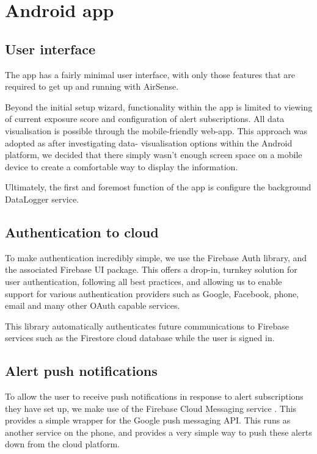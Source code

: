 \documentclass[sigconf, nonacm]{acmart}
\begin{document}
\section{Android app}

\subsection{User interface}

The app has a fairly minimal user interface, with only those features that are required to
get up and running with AirSense. 

Beyond the initial setup wizard, functionality within the app is limited to viewing of current
exposure score and configuration of alert subscriptions. All data visualisation is possible
through the mobile-friendly web-app. This approach was adopted as after investigating data-
visualisation options within the Android platform, we decided that there simply wasn't enough
screen space on a mobile device to create a comfortable way to display the information.

Ultimately, the first and foremost function of the app is configure the background DataLogger
service.

\subsection{Authentication to cloud}

To make authentication incredibly simple, we use the Firebase Auth library\cite{firebase_auth}, and the associated
Firebase UI package. This offers a drop-in, turnkey solution for user authentication, following
all best practices, and allowing us to enable support for various authentication providers
such as Google, Facebook, phone, email and many other OAuth capable services.

This library automatically authenticates future communications to Firebase services such as 
the Firestore cloud database while the user is signed in.

\subsection{Alert push notifications}

To allow the user to receive push notifications in response to alert subscriptions they have
set up, we make use of the Firebase Cloud Messaging service\cite{firebase_messaging} . This provides a simple wrapper
for the Google push messaging API. This runs as another service on the phone, and provides
a very simple way to push these alerts down from the cloud platform.
\end{document}
